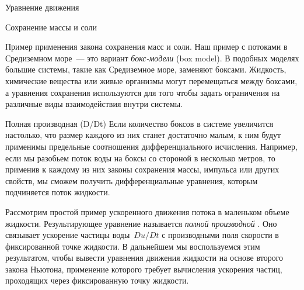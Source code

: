 \begin{chapter}{Уравнение движения}
\begin{section}{Сохранение массы и соли}
\begin{paragraph}{Пример применения закона сохранения масс и соли.}
Наш пример с потоками в Средиземном море~--- это вариант \emph{бокс-модели} 
(box model). В подобных моделях большие системы, такие как Средиземное море,
заменяют боксами. Жидкость, химические вещества или живые организмы
могут перемещаться между боксами, а уравнения сохранения используются
для того чтобы задать ограничения на различные виды взаимодействия
внутри системы.
%
\end{paragraph}
\end{section}

\begin{section}{Полная производная (D/Dt)}
Если количество боксов в системе увеличится настолько, что размер каждого из
них станет достаточно малым, к ним будут применимы предельные соотношения
дифференциального исчисления. Например, если мы разобьем поток воды 
на боксы со стороной в несколько метров, то применив к каждому из них законы
сохранения массы, импульса или других свойств, мы сможем получить 
дифференциальные уравнения, которым подчиняется поток жидкости.
%

Рассмотрим простой пример ускоренного движения потока в маленьком объеме
жидкости. Результирующее уравнение называется \emph{полной производной}%
. 
Оно связывает ускорение частицы воды~$Du/Dt$ с производными поля скорости в
фиксированной точке жидкости. В дальнейшем мы воспользуемся этим результатом,
чтобы вывести уравнения движения жидкости на основе второго закона Ньютона, 
применение которого требует вычисления ускорения частиц, проходящих через 
фиксированную точку жидкости.
%


\end{section}
\end{chapter}
